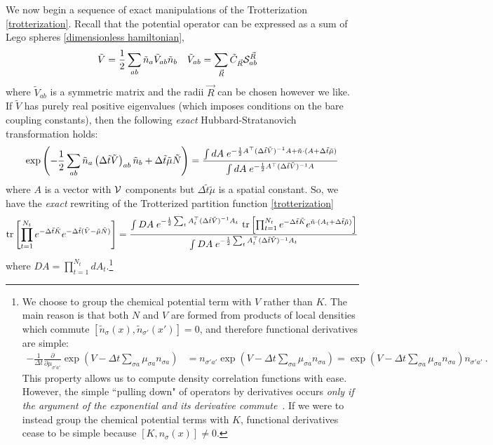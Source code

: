 We now begin a sequence of exact manipulations of the Trotterization \eqref{trotterization}.
Recall that the potential operator can be expressed as a sum of Lego spheres \eqref{dimensionless hamiltonian},
\begin{align}
	\tilde{V}
	&= \frac{1}{2} \sum_{ab} \tilde{n}_a \tilde{V}_{ab} \tilde{n}_b
	&
	\tilde{V}_{ab}
	&=
	\sum_{\vec{R}} \tilde{C}_{\vec{R}} \mathcal{S}^{\vec{R}}_{ab}
\end{align}
where $\tilde{V}_{ab}$ is a symmetric matrix and the radii $\vec{R}$ can be chosen however we like.
If $\tilde{V}$ has purely real positive eigenvalues (which imposes conditions on the bare coupling constants), then the following \emph{exact} Hubbard-Stratanovich transformation holds:
\begin{equation}
	\exp\left( -\frac{1}{2} \sum_{ab}\tilde{n}_a \left(\Delta\tilde{t} \tilde{V}\right)_{ab} \tilde{n}_b + \Delta \tilde{t} \tilde{\mu}\tilde{N}\right)
	=
	\frac{
		\int dA\; e^{-\frac{1}{2} A{}^{\top} (\Delta\tilde{t} \tilde{V})^{-1} A + \tilde{n} \cdot (A + \Delta\tilde{t} \tilde{\mu} )}
	}{
		\int dA\; e^{-\frac{1}{2} A{}^{\top} (\Delta\tilde{t} \tilde{V})^{-1} A}
	}
\end{equation}
where $A$ is a vector with $\mathcal{V}$ components but $\Delta\tilde{t}\tilde{\mu}$ is a spatial constant.
So, we have the \emph{exact} rewriting of the Trotterized partition function \eqref{trotterization}
\begin{equation}
	\text{tr}\left[\prod_{t=1}^{N_t} e^{-\Delta \tilde{t}\tilde{K}}  e^{-\Delta \tilde{t}(\tilde{V} - \tilde{\mu}\tilde{N})} \right]
	= 
	\frac{  
		\int DA\; e^{-\frac{1}{2} \sum_t A{}^{\top}_t (\Delta\tilde{t} \tilde{V})^{-1} A_t}
	~	\text{tr}\left[\prod_{t=1}^{N_t} e^{-\Delta \tilde{t}\tilde{K}}  e^{ \tilde{n}\cdot (A_t + \Delta\tilde{t} \tilde{\mu})} \right] 
	}{ 
		\int DA\; e^{-\frac{1}{2} \sum_t A{}^{\top}_t (\Delta\tilde{t} \tilde{V})^{-1} A_t}
	}
	\label{eq:trotterization bilinearized}
\end{equation}
where $DA = \prod_{t=1}^{N_t} d A_t $.\footnote{
	We choose to group the chemical potential term with $V$ rather than $K$.
	The main reason is that both $N$ and $V$ are formed from products of local densities which commute $[\tilde{n}_{\sigma}(x),\tilde{n}_{\sigma'}(x')] = 0$, and therefore functional derivatives are simple:
	\begin{align*}
		-\frac{1}{\Delta t} \frac{\partial}{\partial \mu_{\sigma 'a'}}\exp\left( V - \Delta t \sum_{\sigma a}\mu_{\sigma a} n_{\sigma a}\right) 
		&
		=  n_{\sigma' a'} \exp\left( V - \Delta t \sum_{\sigma a}\mu_{\sigma a} n_{\sigma a}\right)
		= \exp\left( V - \Delta t \sum_{\sigma a}\mu_{\sigma a} n_{\sigma a}\right) n_{\sigma' a'}~.
	\end{align*} 
	This property allows us to compute density correlation functions with ease.
	However, the simple ``pulling down" of operators by derivatives occurs \emph{only if the argument of the exponential and its derivative commute}~\cite{10.2307/4146900}.
	If we were to instead group the chemical potential terms with $K$, functional derivatives cease to be simple because $[K,n_{\sigma}(x)] \neq 0$.
}

